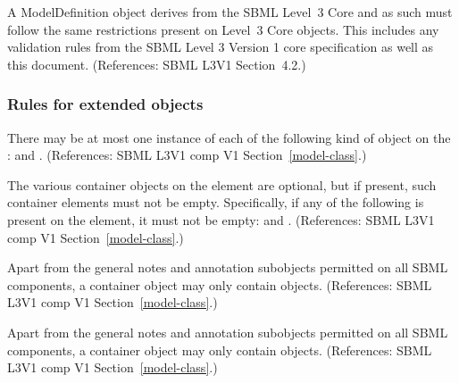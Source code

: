 \begin{sbmlenum}
 { A ModelDefinition object derives from the SBML
  Level~3 Core  and as such must follow the same restrictions 
  present on Level~3 Core \Model objects.
  This includes any validation rules from the SBML Level 3 Version 1
  core specification as well as this document.
   (References: SBML L3V1 Section~4.2.) }

\end{sbmlenum} \subsubsection*{Rules for extended  objects} \begin{sbmlenum}

 { There may be at most one instance of each of the
  following kind of object on the \Model: \ListOfSubmodels and \ListOfPorts. 
  (References: SBML L3V1 comp V1 Section~\ref{model-class}.) }


 { The various  container objects on 
  the \Model element are optional, but if present, such 
  container elements must not be empty. Specifically, if any of the following 
  is present on the \Model element, it must not be empty: 
  \ListOfSubmodels and \ListOfPorts.
  (References: SBML L3V1 comp V1 Section~\ref{model-class}.) }
  

 { Apart from the general notes and annotation
  subobjects permitted on all SBML components, a \ListOfSubmodels
  container object may only contain \Submodel objects.
  (References: SBML L3V1 comp V1 Section~\ref{model-class}.) }


 { Apart from the general notes and annotation
  subobjects permitted on all SBML components, a
  \ListOfPorts container object may only contain \Port objects.
  (References: SBML L3V1 comp V1 Section~\ref{model-class}.) }
  






\end{sbmlenum}
